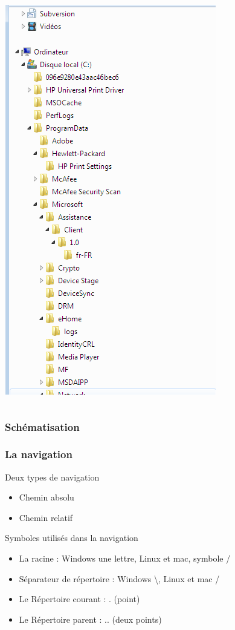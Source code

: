 \documentclass[table,svgnames,hyperref={pdfpagemode=FullScreen}]{beamer}
\begin{document}
\begin{frame}
\begin{columns}
\begin{column}[c]{5cm}
				\includegraphics[scale=0.25]{image/ArboWin.png}
			\end{column}
		\end{columns}
\end{frame}

\begin{frame}
		\frametitle{Schématisation}
		\begin{center}
			
		\end{center}
\end{frame}	

\begin{frame}
		\frametitle{La navigation}
		\begin{block}{Deux types de navigation}
			\begin{itemize}
				\item Chemin absolu
				\item Chemin relatif
			\end{itemize}
		\end{block}
		\begin{block}{Symboles utilisés dans la navigation}
			\begin{itemize}
				\item La racine : Windows une lettre, Linux et mac, symbole / 
				\item Séparateur de répertoire : Windows  \textbackslash, Linux et mac  /
				\item Le Répertoire courant : . (point)
				\item Le Répertoire parent : .. (deux points)
			\end{itemize}
		\end{block}
\end{frame}
\end{document}
